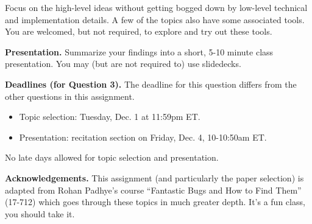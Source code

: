 \documentclass[11pt]{article}
\begin{document}
Focus on the high-level ideas without getting bogged down by low-level technical and implementation details. A few of the topics also have some associated tools. You are welcomed, but not required, to explore and try out these tools.

\vspace{1em}
\noindent\textbf{Presentation.} Summarize your findings into a short, 5-10 minute class presentation. You may (but are not required to) use slidedecks.

\vspace{1em}
\noindent\textbf{Deadlines (for Question 3).}
The deadline for this question differs from the other questions in this assignment.
\begin{itemize}
  \item Topic selection: Tuesday, Dec. 1 at 11:59pm ET.
  \item Presentation: recitation section on Friday, Dec. 4, 10-10:50am ET.
\end{itemize}

No late days allowed for topic selection and presentation.

\vspace{1em}
\noindent\textbf{Acknowledgements.} This assignment (and particularly the paper selection) is adapted from Rohan Padhye's course ``Fantastic Bugs and How to Find Them'' (17-712) which goes through these topics in much greater depth. It's a fun class, you should take it.
\end{document}
